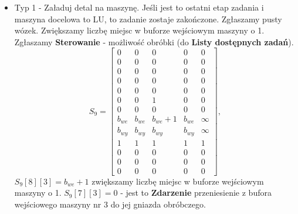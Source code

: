 \documentclass[10pt, a4paper]{article}
\begin{document}
\begin{itemize}
\begin{equation*}
\begin{array}{ccccc}
0 & 0 & 1 & 0 & 0\\
0 & 0 & 1 & 0& 0\\
b_{we}& b_{we}& b_{we}& b_{we} & \infty\\
b_{wy}& b_{wy}& b_{wy}& b_{wy} & \infty\\
1& 1& 1& 1 & 1\\
0 & 0 & 0 & 0 & 0\\
0 & 0 & 0 & 0 & 0\\
0 & 0 & 0 & 0 & 0
\end{array}\right],
\end{equation*}
$S_8[3][3]=0$, $S_8[6][3]=1$ mamy pusty wózek przy maszynie nr 3, $S_8[7][3]=1$ mamy detal w buforze wejściowym maszyny nr 3. Zgłaszamy możliwość \textbf{Sterowania} - załadunek detalu na maszynę.

\item Typ 1 - Załaduj detal na maszynę. Jeśli jest to ostatni etap zadania i maszyna docelowa to LU, to zadanie zostaje zakończone. Zgłaszamy pusty wózek. Zwiększamy liczbę miejsc w buforze wejściowym maszyny o 1. Zgłaszamy \textbf{Sterowanie} - możliwość obróbki (do \textbf{Listy dostępnych zadań}).
\begin{equation*}
S_9=\left[\begin{array}{ccccc}
0 & 0 & 0 & 0&0\\
0 & 0 & 0 & 0 & 0\\
0 & 0 & 0 & 0& 0\\
0 & 0 & 0 & 0& 0\\
0 & 0 & 0 & 0& 0\\
0 & 0 & 1 & 0 & 0\\
0 & 0 & 0 & 0& 0\\
b_{we}& b_{we}& b_{we}+1& b_{we} & \infty\\
b_{wy}& b_{wy}& b_{wy}& b_{wy} & \infty\\
1& 1& 1& 1 & 1\\
0 & 0 & 0 & 0 & 0\\
0 & 0 & 0 & 0 & 0\\
0 & 0 & 0 & 0 & 0
\end{array}\right],
\end{equation*}
$S_9[8][3]=b_{we}+1$ zwiększamy liczbę miejsc w buforze wejściowym maszyny o 1. $S_9[7][3]=0$ - jest to \textbf{Zdarzenie} przeniesienie z bufora wejściowego maszyny nr 3 do jej gniazda obróbczego.



\end{itemize}
\end{document}
